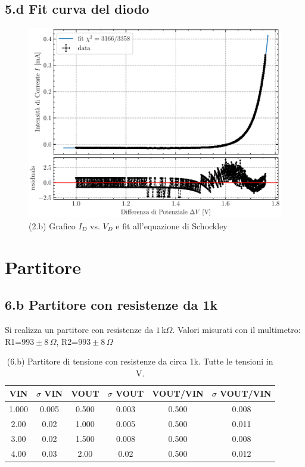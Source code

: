 \documentclass[10pt,a4paper]{article}
\begin{document}
\subsection*{5.d Fit curva del diodo}
\par

\begin{figure}[htb]
\centering
\includegraphics[scale=0.7]{ivfit}
\caption{(2.b) Grafico $I_{D}$ vs. $V_{D}$ e fit all'equazione di Schockley}
\end{figure}

\section{Partitore}

\subsection*{6.b Partitore con resistenze da 1k}

Si realizza un partitore con resistenze da $1 \,\mathrm{k}\Omega$.
Valori misurati con il multimetro: R1=$993 \pm 8 \,\Omega$,
R2=$993 \pm 8 \,\Omega$


\begin{table}[h]
\centering
\begin{tabular}{|c|c|c|c|c|c|}
\hline 
VIN& $\sigma$ VIN  & VOUT	 & $\sigma$ VOUT & VOUT/VIN & $\sigma$ VOUT/VIN \\
\hline 
1.000 & 0.005 & 0.500 & 0.003 & 0.500 & 0.008 \\
2.00 & 0.02 & 1.000 & 0.005 & 0.500 & 0.011 \\
3.00 & 0.02 & 1.500 & 0.008 & 0.500 &0.008 \\
4.00 & 0.03 & 2.00 & 0.02 & 0.500 & 0.012 \\
\hline 
\end{tabular} 
\caption{(6.b) Partitore di tensione con resistenze da circa 1k. Tutte le
tensioni in V.\label{tab:div1k}}
\end{table}
\end{document}
